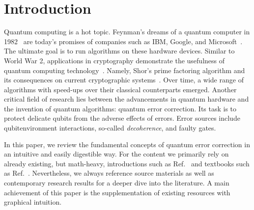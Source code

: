 \section{Introduction}

Quantum computing is a hot topic. Feynman's dreams of a quantum computer in 1982~\cite{feynman1982simulating} are today's promises of companies such as IBM, Google, and Microsoft~\cite{ibm_ibm_2024,google_quantum_ai_our_2024,azure_quantum_2024}. The ultimate goal is to run algorithms on these hardware devices. Similar to World War 2, applications in cryptography demonstrate the usefulness of quantum computing technology~\cite{preskill_quantum_2023}. Namely, Shor's prime factoring algorithm and its consequences on current cryptographic systems~\cite{shor_factoring_1997}. Over time, a wide range of algorithms with speed-ups over their classical counterparts emerged. Another critical field of research lies between the advancements in quantum hardware and the invention of quantum algorithms: quantum error correction. Its task is to protect delicate qubits from the adverse effects of errors. Error sources include qubit\hyph{}environment interactions, so-called \textit{decoherence}, and faulty gates.

In this paper, we review the fundamental concepts of quantum error correction in an intuitive and easily digestible way. For the content we primarily rely on already existing, but math-heavy, introductions such as Ref.~\cite{gottesman_introduction_2009} and textbooks such as Ref.~\cite{nielsen00}. Nevertheless, we always reference source materials as well as contemporary research results for a deeper dive into the literature. A main achievement of this paper is the supplementation of existing resources with graphical intuition.